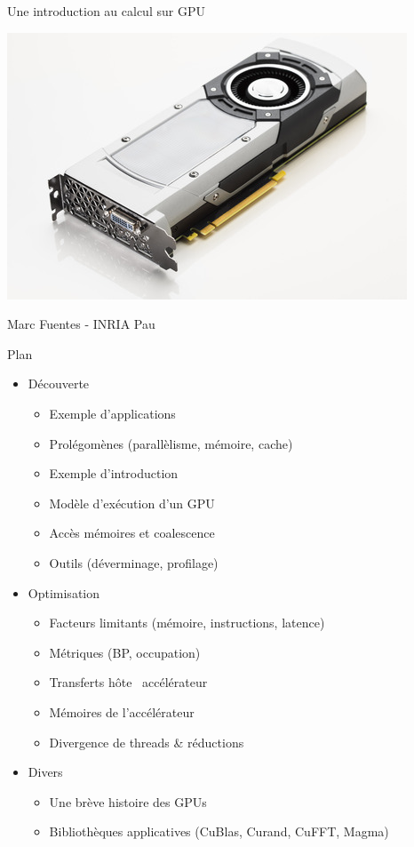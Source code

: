 \documentclass[11pt,mathserif]{beamer}
\newcommand{\geziBikoitz}{\faArrowsH}
\begin{document}
\begin{frame}
\begin{center}
  {\Large Une introduction au calcul sur GPU} 
\end{center}
\begin{center}
\includegraphics[width=0.5\linewidth]{fig/gpu.jpg}
\end{center}
\begin{center}
{\large Marc Fuentes - INRIA Pau\\ }
\end{center}
\end{frame}

\begin{frame}{Plan}
\begin{itemize}[<+->]
   \item Découverte
     \begin{itemize}
       \item Exemple d'applications 
       \item Prolégomènes (parallèlisme, mémoire, cache)
       \item Exemple d'introduction
       \item Modèle d'exécution d'un GPU
       \item Accès mémoires et coalescence
       \item Outils (déverminage, profilage)
     \end{itemize}
 \item Optimisation 
     \begin{itemize}
       \item Facteurs limitants (mémoire, instructions, latence)
       \item Métriques (BP, occupation)
       \item Transferts hôte \geziBikoitz\ accélérateur
       \item Mémoires de l'accélérateur
       \item Divergence de threads \& réductions
     \end{itemize}
  \item Divers
     \begin{itemize}
       \item Une brève histoire des GPUs
       \item Bibliothèques applicatives (CuBlas, Curand, CuFFT, Magma)
     \end{itemize}
\end{itemize}
\end{frame}
\end{document}
